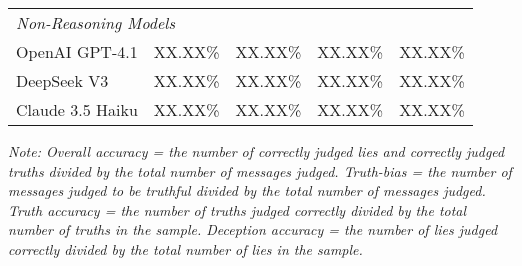 \documentclass{article}
\begin{document}
\begin{table}[ht]
\begin{tabular}{lcccc}
\midrule
\multicolumn{5}{l}{\textit{Non-Reasoning Models}} \\
OpenAI GPT-4.1 & XX.XX\% & XX.XX\% & XX.XX\% & XX.XX\% \\
DeepSeek V3 & XX.XX\% & XX.XX\% & XX.XX\% & XX.XX\% \\
Claude 3.5 Haiku & XX.XX\% & XX.XX\% & XX.XX\% & XX.XX\% \\
\bottomrule
\end{tabular}
\label{tab:model_performance}
\footnotetext{}
\parbox[t]{\linewidth}{\footnotesize \textit{Note: Overall accuracy = the number of correctly judged lies and correctly judged truths divided by the total number of messages judged. Truth-bias = the number of messages judged to be truthful divided by the total number of messages judged. Truth accuracy = the number of truths judged correctly divided by the total number of truths in the sample. Deception accuracy = the number of lies judged correctly divided by the total number of lies in the sample.}}
\end{table}
\end{document}
